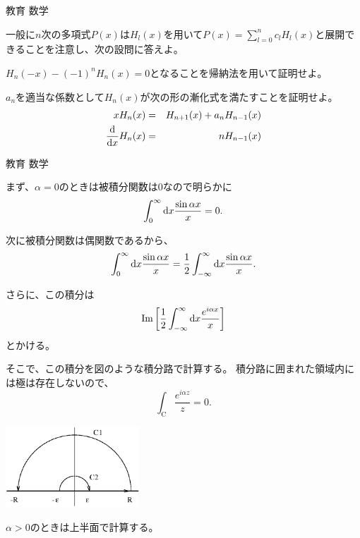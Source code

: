 \documentclass[fleqn]{jbook}
\begin{document}
\begin{question}{教育 数学}{}
\begin{subquestions}
\begin{subsubquestions}
一般に$n$次の多項式$P(x)$は$H_l(x)$を用いて$P(x)=\displaystyle{\sum_{l=0}^{n} c_l H_l (x)}$と展開できることを注意し、次の設問に答えよ。

\SubSubQuestion
$H_n(-x)-(-1)^n H_n(x) = 0$となることを帰納法を用いて証明せよ。

\SubSubQuestion
$a_n$を適当な係数として$H_n(x)$が次の形の漸化式を満たすことを証明せよ。
\begin{eqnarray*}
x H_n(x) &=& H_{n+1} (x) + a_n H_{n-1} (x) \\
\frac{\d}{\d x} H_n (x) &=& n H_{n-1} (x)
\end{eqnarray*}
\end{subsubquestions}
\end{subquestions}
\end{question}
\begin{answer}{教育 数学}{}
\begin{subanswers}
\SubAnswer
\begin{subsubanswers}
\SubSubAnswer
まず、$\alpha  = 0$のときは被積分関数は$0$なので明らかに
\[ \int_{0}^{\infty} {\rm d}x \frac{\sin \alpha x}{x} = 0.\]

次に被積分関数は偶関数であるから、
\[ \int_{0}^{\infty} {\rm d}x \frac{\sin \alpha x}{x} = \frac{1}{2} \int_{-\infty}
^{\infty} {\rm d}x \frac{\sin \alpha x}{x}.\]
\parbox[t]{110mm}{さらに、この積分は
\[ \mbox{Im} \left[ \frac{1}{2} \int_{-\infty}^{\infty} {\rm d}x
\frac{e^{i \alpha x}}{x} \right]\]
とかける。

そこで、この積分を図のような積分路で計算する。
積分路に囲まれた領域内には極は存在しないので、
\[ \int_{\text{C}} \frac{e^{i \alpha z}}{z} = 0.\] }
\parbox[t]{60mm}{\vspace*{3mm}
\begin{center}
\includegraphics[clip,width=50mm]{1998math1.eps}
\end{center}
}
$ \alpha > 0$のときは上半面で計算する。


\end{subsubanswers}
\end{subanswers}
\end{answer}
\end{document}
